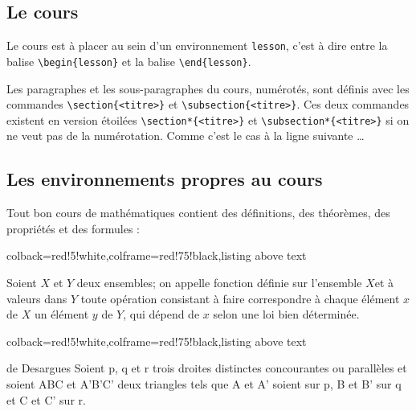 \begin{lesson}
\section{Le cours}

Le cours est à placer au sein d'un environnement \verb|lesson|, c'est à dire entre la balise \verb|\begin{lesson}| et la balise \verb|\end{lesson}|.

Les paragraphes et les sous-paragraphes du cours, numérotés, sont définis avec les commandes \verb|\section{<titre>}| et \verb|\subsection{<titre>}|. Ces deux commandes existent en version étoilées  \verb|\section*{<titre>}|  et \verb|\subsection*{<titre>}| si on ne veut pas de la numérotation. Comme c'est le cas à la ligne suivante \ldots

\subsection*{Les environnements propres au cours}
Tout bon cours de mathématiques contient des définitions, des théorèmes, des propriétés et des formules :


 \begin{tcblisting}{colback=red!5!white,colframe=red!75!black,listing above text}
\begin{definition}{}
Soient $X$ et $Y$ deux ensembles; on appelle fonction définie sur l'ensemble $X$et à valeurs dans $Y$ toute opération consistant à faire correspondre à chaque élément $x$ de $X$ un élément $y$ de $Y$, qui dépend de $x$ selon une loi bien déterminée.
\end{definition}
\end{tcblisting}

 \begin{tcblisting}{colback=red!5!white,colframe=red!75!black,listing above text}
\begin{theorem}{de Desargues}
Soient p, q et r trois droites distinctes concourantes ou parallèles et soient ABC et A'B'C' deux triangles tels que A et A' soient sur p, B et B' sur q et C et C' sur r.


\end{theorem}
\end{tcblisting}
\end{lesson}
